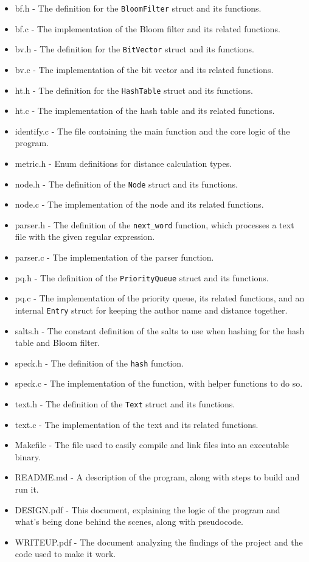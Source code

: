 \documentclass[12pt]{article}
\begin{document}
\begin{itemize}
    \item bf.h - The definition for the \verb|BloomFilter| struct and its functions.
    \item bf.c - The implementation of the Bloom filter and its related functions.
    \item bv.h - The definition for the \verb|BitVector| struct and its functions.
    \item bv.c - The implementation of the bit vector and its related functions.
    \item ht.h - The definition for the \verb|HashTable| struct and its functions.
    \item ht.c - The implementation of the hash table and its related functions.
    \item identify.c - The file containing the main function and the core logic of the program.
    \item metric.h - Enum definitions for distance calculation types.
    \item node.h - The definition of the \verb|Node| struct and its functions.
    \item node.c - The implementation of the node and its related functions.
    \item parser.h - The definition of the \verb|next_word| function, which processes a text file with the given regular expression.
    \item parser.c - The implementation of the parser function.
    \item pq.h - The definition of the \verb|PriorityQueue| struct and its functions.
    \item pq.c - The implementation of the priority queue, its related functions, and an internal \verb|Entry| struct for keeping the author name and distance together.
    \item salts.h - The constant definition of the salts to use when hashing for the hash table and Bloom filter.
    \item speck.h - The definition of the \verb|hash| function.
    \item speck.c - The implementation of the function, with helper functions to do so.
    \item text.h - The definition of the \verb|Text| struct and its functions.
    \item text.c - The implementation of the text and its related functions.
    \item Makefile - The file used to easily compile and link files into an executable binary.
    \item README.md - A description of the program, along with steps to build and run it.
    \item DESIGN.pdf - This document, explaining the logic of the program and what's being done behind the scenes, along with pseudocode.
    \item WRITEUP.pdf - The document analyzing the findings of the project and the code used to make it work.
\end{itemize}
\end{document}
